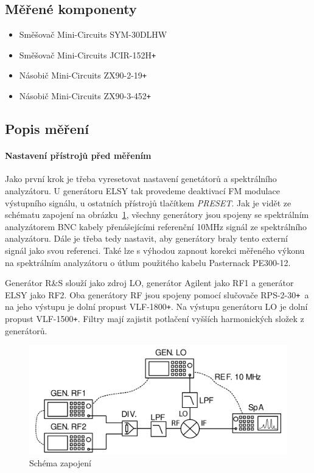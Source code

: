 \documentclass[11pt,a4paper]{article}
\newcommand{\plus}{{\texttt{+}}}
\begin{document}
\subsection*{Měřené komponenty}
\begin{itemize}
    \item Směšovač Mini-Circuits SYM-30DLHW
    \item Směšovač Mini-Circuits JCIR-152H\plus
    \item Násobič Mini-Circuits ZX90-2-19\plus
    \item Násobič Mini-Circuits ZX90-3-452\plus
\end{itemize}

\subsection*{Popis měření}
\paragraph*{Nastavení přístrojů před měřením} Jako první krok je třeba vyresetovat nastavení genetátorů a spektrálního analyzátoru. U generátoru ELSY tak provedeme deaktivací FM modulace výstupního signálu, u ostatních přístrojů tlačítkem \emph{PRESET}. Jak je vidět ze schématu zapojení na obrázku~\ref{fig:task0-zapojeni}, všechny generátory jsou spojeny se spektrálním analyzátorem BNC kabely přenášejícími referenční 10MHz signál ze spektrálního analyzátoru. Dále je třeba tedy nastavit, aby generátory braly tento externí signál jako svou referenci. Také lze s výhodou zapnout korekci měřeného výkonu na spektrálním analyzátoru o útlum použitého kabelu Pasternack PE300-12.

Generátor R\&S slouží jako zdroj LO, generátor Agilent jako RF1 a generátor ELSY jako RF2. Oba generátory RF jsou spojeny pomocí slučovače RPS-2-30\plus~a na jeho výstupu je dolní propust VLF-1800\plus. Na výstupu generátoru LO je dolní propust VLF-1500\plus. Filtry mají zajistit potlačení vyšších harmonických složek z generátorů.
\begin{figure}[!ht]
    \centering
    \includegraphics[width=.65\textwidth]{src/task0-zapojeni.png}
    \caption{Schéma zapojení}
    \label{fig:task0-zapojeni}
\end{figure}
\end{document}
